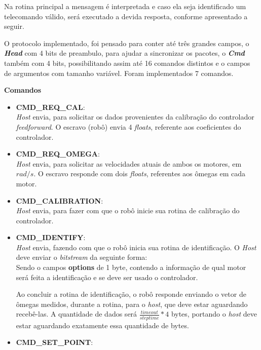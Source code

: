 Na rotina principal a mensagem é interpretada e caso ela seja identificado um telecomando válido, será executado a devida resposta, conforme apresentado a seguir.

O protocolo implementado, foi pensado para conter até três grandes campos, o \textbf{\textit{Head}} com 4 bits de preambulo, para ajudar a sincronizar os pacotes, o \textbf{\textit{Cmd}} também com 4 bits, possibilitando assim até 16 comandos distintos e o campos de argumentos com tamanho variável. Foram implementados 7 comandos. 


    
\textbf{Comandos}
\begin{itemize}
    \item \textbf{CMD\_REQ\_CAL}:\\
        \textit{Host} envia, para solicitar os dados provenientes da calibração do controlador \textit{feedforward}. O escravo (robô) envia 4 \emph{floats}, referente aos coeficientes do controlador.
    \item \textbf{CMD\_REQ\_OMEGA}:\\
        \textit{Host} envia, para solicitar as velocidades atuais de ambos os motores, em $rad/s$. O escravo responde com dois \emph{floats}, referentes aos ômegas em cada motor.
    \item \textbf{CMD\_CALIBRATION}:\\
        \textit{Host} envia, para fazer com que o robô inicie sua rotina de calibração do controlador.
    \item \textbf{CMD\_IDENTIFY}:\\
        \textit{Host} envia, fazendo com que o robô inicia sua rotina de identificação. O \textit{Host} deve enviar o \emph{bitstream} da seguinte forma:\\
        
        
        
        Sendo o campos \textbf{options} de 1 byte, contendo a informação de qual motor será feita a identificação e se deve ser usado o controlador.
        
        Ao concluir a rotina de identificação, o robô responde enviando o vetor de ômegas medidos, durante a rotina, para o \textit{host}, que deve estar aguardando recebê-las. A quantidade de dados será $\frac{timeout}{steptime}*4$ bytes, portando o \textit{host} deve estar aguardando exatamente essa quantidade de bytes.
        
        
    \item \textbf{CMD\_SET\_POINT}:\\
        

\end{itemize}
